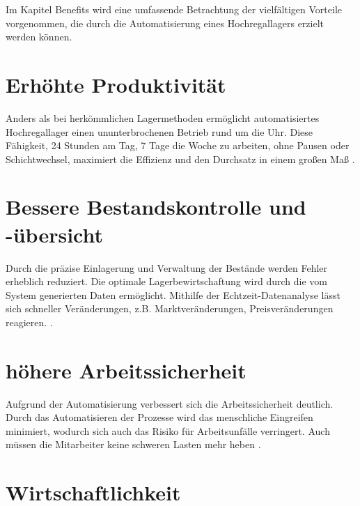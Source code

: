 Im Kapitel Benefits wird eine umfassende Betrachtung der vielfältigen Vorteile vorgenommen, die durch die Automatisierung eines Hochregallagers erzielt werden können. 

	\section{Erhöhte Produktivität}
	Anders als bei herkömmlichen Lagermethoden ermöglicht automatisiertes Hochregallager einen ununterbrochenen Betrieb rund um die Uhr.
	Diese Fähigkeit, 24 Stunden am Tag, 7 Tage die Woche zu arbeiten, ohne Pausen oder Schichtwechsel, maximiert die Effizienz und den Durchsatz in einem großen Maß \autocite{ludwiniak_automatisches_2023}.
	\section{Bessere Bestandskontrolle und -übersicht}
	Durch die präzise Einlagerung und Verwaltung der Bestände werden Fehler erheblich reduziert. Die optimale Lagerbewirtschaftung wird durch die vom System generierten Daten ermöglicht. Mithilfe der Echtzeit-Datenanalyse lässt sich schneller Veränderungen, z.B. Marktveränderungen, Preisveränderungen reagieren.  \autocite{aiut_logistics_2024}.
	\section{höhere Arbeitssicherheit}
	Aufgrund der Automatisierung verbessert sich die Arbeitssicherheit deutlich. Durch das Automatisieren der Prozesse wird das menschliche Eingreifen minimiert, wodurch sich auch das Risiko für Arbeitsunfälle verringert. Auch müssen die Mitarbeiter keine schweren Lasten mehr heben \autocite{ohra_automatisierte_2024}.
	\section{Wirtschaftlichkeit}

